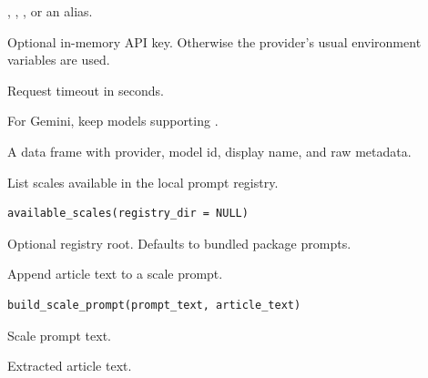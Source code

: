 \documentclass[a4paper]{book}
\begin{document}
%
\begin{Arguments}
\begin{ldescription}
\item[\code{provider}] , , , or an alias.

\item[\code{api\_key}] Optional in-memory API key. Otherwise the provider's usual
environment variables are used.

\item[\code{timeout}] Request timeout in seconds.

\item[\code{supported\_only}] For Gemini, keep models supporting .
\end{ldescription}
\end{Arguments}
%
\begin{Value}
A data frame with provider, model id, display name, and raw metadata.
\end{Value}
%
\begin{Description}
List scales available in the local prompt registry.
\end{Description}
%
\begin{Usage}
\begin{verbatim}
available_scales(registry_dir = NULL)
\end{verbatim}
\end{Usage}
%
\begin{Arguments}
\begin{ldescription}
\item[\code{registry\_dir}] Optional registry root. Defaults to bundled package prompts.
\end{ldescription}
\end{Arguments}
%
\begin{Description}
Append article text to a scale prompt.
\end{Description}
%
\begin{Usage}
\begin{verbatim}
build_scale_prompt(prompt_text, article_text)
\end{verbatim}
\end{Usage}
%
\begin{Arguments}
\begin{ldescription}
\item[\code{prompt\_text}] Scale prompt text.

\item[\code{article\_text}] Extracted article text.
\end{ldescription}
\end{Arguments}
\end{document}
